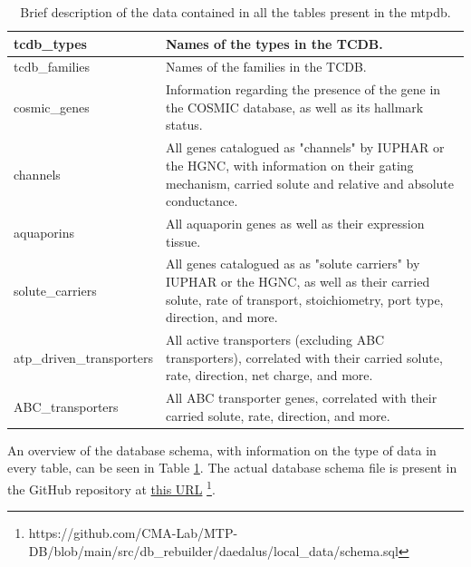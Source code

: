 \begin{table}
\begin{tabularx}{\textwidth}{|l|X|}
tcdb\_types               & Names of the types in the TCDB.                                                                                                                                     \\ \hline
tcdb\_families            & Names of the families in the TCDB.                                                                                                                                  \\ \hline
cosmic\_genes             & Information regarding the presence of the gene in the COSMIC database, as well as its hallmark status.                                                              \\ \hline
channels                  & All genes catalogued as "channels" by IUPHAR or the HGNC, with information on their gating mechanism, carried solute and relative and absolute conductance.         \\ \hline
aquaporins                & All aquaporin genes as well as their expression tissue.                                                                                                             \\ \hline
solute\_carriers          & All genes catalogued as as "solute carriers" by IUPHAR or the HGNC, as well as their carried solute, rate of transport, stoichiometry, port type, direction, and more. \\ \hline
atp\_driven\_transporters & All active transporters (excluding ABC transporters), correlated with their carried solute, rate, direction, net charge, and more.                                  \\ \hline
ABC\_transporters         & All ABC transporter genes, correlated with their carried solute, rate, direction, and more.                                                                         \\ \hline
\end{tabularx}%
\caption{Brief description of the data contained in all the tables present in the \gls{mtpdb}.}
\label{tab:databaseSchema}
\end{table}

An overview of the database schema, with information on the type of data in
every table, can be seen in Table \ref{tab:databaseSchema}. The actual database
schema file is present in the GitHub repository at
\href{https://github.com/CMA-Lab/MTP-DB/blob/main/src/db_rebuilder/daedalus/local_data/schema.sql}{this URL} \footnote{https://github.com/CMA-Lab/MTP-DB/blob/main/src/db\_rebuilder/daedalus/local\_data/schema.sql}.

